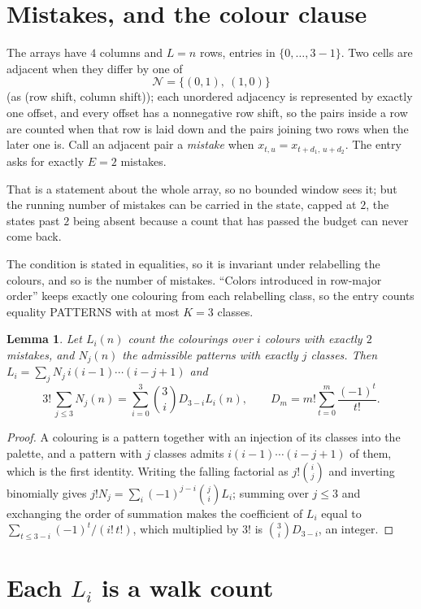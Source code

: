 \documentclass[11pt,a4paper]{article}
\theoremstyle{plain}
\newtheorem{lemma}[theorem]{Lemma}
\theoremstyle{definition}
\begin{document}
\section{Mistakes, and the colour clause}

The arrays have $4$ columns and $L=n$ rows, entries in $\{0,\dots,3-1\}$.
Two cells are adjacent when they differ by one of
\[
\mathcal N=\{(0,1),\ (1,0)\}
\]
(as (row shift, column shift)); each unordered adjacency is represented by exactly one
offset, and every offset has a nonnegative row shift, so the pairs inside a row are
counted when that row is laid down and the pairs joining two rows when the later one
is. Call an adjacent pair a \emph{mistake} when $x_{t,u}=x_{t+d_1,\,u+d_2}$. The entry asks for exactly
$E=2$ mistakes.

That is a statement about the whole array, so no bounded window sees it; but the running
number of mistakes can be carried in the state, capped at $2$, the states past $2$ being
absent because a count that has passed the budget can never come back.

The condition is stated in equalities, so it is invariant under relabelling the colours, and
so is the number of mistakes. ``Colors introduced in row-major order'' keeps exactly one
colouring from each relabelling class, so the entry counts equality PATTERNS with at most
$K=3$ classes.

\begin{lemma}\label{lem:inv}
Let $L_i(n)$ count the colourings over $i$ colours with exactly $2$ mistakes, and $N_j(n)$
the admissible patterns with exactly $j$ classes. Then
$L_i=\sum_j N_j\,i(i-1)\cdots(i-j+1)$ and
\[
3!\,\sum_{j\le3}N_j(n)=\sum_{i=0}^{3}\binom{3}{i}D_{3-i}L_i(n),
\qquad D_m=m!\sum_{t=0}^{m}\frac{(-1)^t}{t!} .
\]
\end{lemma}

\begin{proof}
A colouring is a pattern together with an injection of its classes into the palette, and a
pattern with $j$ classes admits $i(i-1)\cdots(i-j+1)$ of them, which is the first identity.
Writing the falling factorial as $j!\binom{i}{j}$ and inverting binomially gives
$j!N_j=\sum_i(-1)^{j-i}\binom{j}{i}L_i$; summing over $j\le3$ and exchanging the order
of summation makes the coefficient of $L_i$ equal to $\sum_{t\le3-i}(-1)^t/(i!\,t!)$,
which multiplied by $3!$ is $\binom{3}{i}D_{3-i}$, an integer.
\end{proof}

\section{Each $L_i$ is a walk count}
\end{document}
